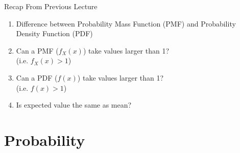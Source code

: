 \begin{frame}{Recap From Previous Lecture}
    \begin{enumerate}
        \item Difference between Probability Mass Function (PMF) and Probability Density Function (PDF)
        \item Can a PMF ($f_X(x)$) take values larger than 1?\\(i.e. $f_X(x)>1$)
        \item Can a PDF ($f(x)$) take values larger than 1?\\(i.e. $f(x)>1$)
        \item Is expected value the same as mean?
    \end{enumerate}
\end{frame}

\section{Probability}

